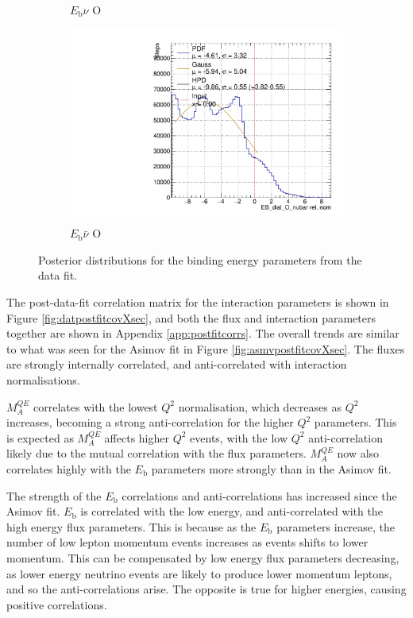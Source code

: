 \begin{figure}[!htbp]
\begin{subfigure}{.48\textwidth}
  \caption{$E_{\mathrm{b}}\nu$ O}
\end{subfigure}
\begin{subfigure}{.48\textwidth}
  \centering
  \includegraphics[width=0.73\linewidth]{figs/EB_dial_O_nubarDataPoly}
  \caption{$E_{\mathrm{b}}\bar{\nu}$ O}
\end{subfigure}
\caption{Posterior distributions for the binding energy parameters from the data fit.}
\label{fig:Ebdatares}
\end{figure}

The post-data-fit correlation matrix for the interaction parameters is shown in Figure \ref{fig:datpostfitcovXsec}, and both the flux and interaction parameters together are shown in Appendix \ref{app:postfitcorrs}. The overall trends are similar to what was seen for the Asimov fit in Figure \ref{fig:asmvpostfitcovXsec}. The fluxes are strongly internally correlated, and anti-correlated with interaction normalisations. 

$M^{QE}_A$ correlates with the lowest $Q^2$ normalisation, which decreases as $Q^2$ increases, becoming a strong anti-correlation for the higher $Q^2$ parameters. This is expected as $M^{QE}_A$ affects higher $Q^2$ events, with the low $Q^2$ anti-correlation likely due to the mutual correlation with the flux parameters. $M^{QE}_A$ now also correlates highly with the $E_{\mathrm{b}}$ parameters more strongly than in the Asimov fit.

The strength of the $E_{\mathrm{b}}$ correlations and anti-correlations has increased since the Asimov fit. $E_{\mathrm{b}}$ is correlated with the low energy, and anti-correlated with the high energy flux parameters. This is because as the $E_{\mathrm{b}}$ parameters increase, the number of low lepton momentum events increases as events shifts to lower momentum. This can be compensated by low energy flux parameters decreasing, as lower energy neutrino events are likely to produce lower momentum leptons, and so the anti-correlations arise. The opposite is true for higher energies, causing positive correlations.

